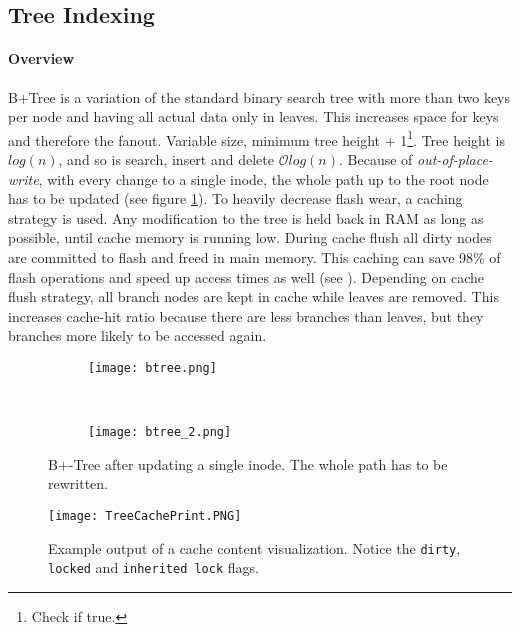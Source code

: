 \subsection{Tree Indexing}
\label{b+tree}
\paragraph{Overview}
B+Tree is a variation of the standard binary search tree with more than two keys per node and having all actual data only in leaves. This increases space for keys and therefore the fanout. Variable size, minimum tree height + 1\footnote{Check if true.}. Tree height is $log(n)$, and so is search, insert and delete $\mathcal{O}log(n)$. Because of \textit{out-of-place-write}, with every change to a single inode, the whole path up to the root node has to be updated (see figure \ref{fig:btreewandering}). To heavily decrease flash wear, a caching strategy is used. Any modification to the tree is held back in RAM as long as possible, until cache memory is running low. During cache flush all dirty nodes are committed to flash and freed in main memory. This caching can save 98\% of flash operations and speed up access times as well (see ). Depending on cache flush strategy, all branch nodes are kept in cache while leaves are removed. This increases cache-hit ratio because there are less branches than leaves, but they branches more likely to be accessed again.

\begin{figure}[htp]
	\centering
	\begin{subfigure}[t]{.9\textwidth}
		\centering\texttt{[image: btree.png]}
	\end{subfigure}\\
	\begin{subfigure}[t]{.9\textwidth}
		\centering\texttt{[image: btree\_2.png]}
	\end{subfigure}
	\caption{\label{fig:btreewandering}B+-Tree after updating a single inode. The whole path has to be rewritten.}
\end{figure}

\begin{figure}[htp]
	\centering\texttt{[image: TreeCachePrint.PNG]}
	\caption{\label{fig:TreeCachePrint}Example output of a cache content visualization. Notice the \texttt{dirty}, \texttt{locked} and \texttt{inherited lock} flags.}
\end{figure}

